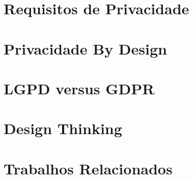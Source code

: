 \section{Requisitos de Privacidade}


\section{Privacidade By Design}


\section{LGPD versus GDPR}



\section{Design Thinking}



\section{Trabalhos Relacionados}




